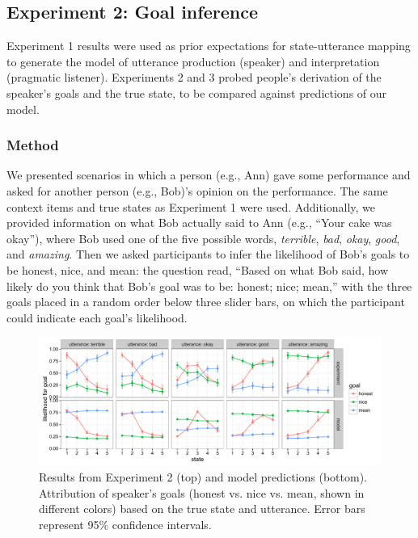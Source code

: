 \documentclass[10pt,letterpaper]{article}
\begin{document}
\subsection{Experiment 2: Goal inference}

Experiment 1 results were used as prior expectations for state-utterance mapping to generate the model of utterance production (speaker) and interpretation (pragmatic listener). Experiments 2 and 3 probed people's derivation of the speaker's goals and the true state, to be compared against predictions of our model. 

\subsubsection{Method} 

We presented scenarios in which a person (e.g., Ann) gave some performance and asked for another person (e.g., Bob)'s opinion on the performance. The same context items and true states as Experiment 1 were used. Additionally, we provided information on what Bob actually said to Ann (e.g., ``Your cake was okay''), where Bob used one of the five possible words,  \emph{terrible}, \emph{bad}, \emph{okay}, \emph{good}, and \emph{amazing}. Then we asked participants to infer the likelihood of Bob's goals to be honest, nice, and mean: the question read, ``Based on what Bob said, how likely do you think that Bob's goal was to be: honest; nice; mean,'' with the three goals placed in a random order below three slider bars, on which the participant could indicate each goal's likelihood.

\begin{figure}[t]
\begin{center} 
  \includegraphics[width=.9\textwidth]{figures/exp2.pdf}
  \caption{\label{fig:exp2} Results from Experiment 2 (top) and model predictions (bottom). Attribution of speaker's goals (honest vs. nice vs. mean, shown in different colors) based on the true state and utterance. Error bars represent 95\% confidence intervals.}
  \end{center} 
\end{figure}
\end{document}

